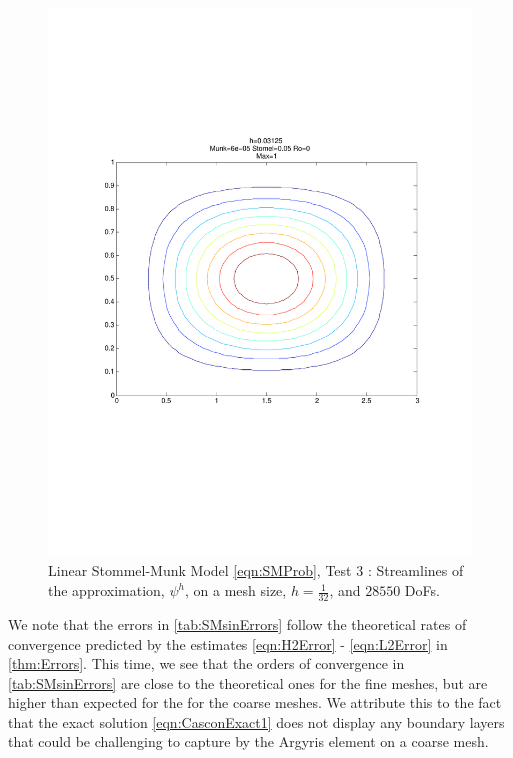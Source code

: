 \begin{figure}%
  \begin{center}
    \includegraphics[trim=0 200 20 220, clip=true, scale=0.5]{StommelMunk1.pdf}
    \caption{Linear Stommel-Munk Model \eqref{eqn:SMProb}, Test 3 \cite{Cascon}: Streamlines of the approximation,
    $\psi^h$, on a mesh size, $h=\frac{1}{32}$, and $28550$ DoFs.}
    \label{fig:StommelMunkSin}
  \end{center}
\end{figure}

We note that the errors in \autoref{tab:SMsinErrors} follow the theoretical
rates of convergence predicted by the estimates \eqref{eqn:H2Error} -
\eqref{eqn:L2Error} in \autoref{thm:Errors}.  This time, we see that the orders
of convergence in \autoref{tab:SMsinErrors} are close to the theoretical ones
for the fine meshes, but are higher than expected for the for the coarse meshes.
We attribute this to the fact that the exact solution \eqref{eqn:CasconExact1}
does not display any boundary layers that could be challenging to capture by the
Argyris element on a coarse mesh.

